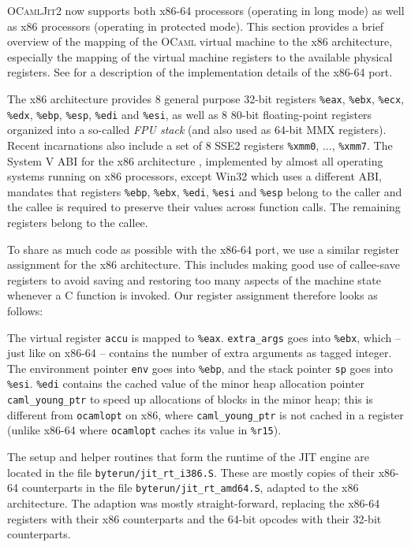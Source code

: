 \documentclass[12pt,a4paper,final]{article}
\begin{document}
\textsc{OCamlJit2} now supports both x86-64 processors (operating in long mode)
as well as x86 processors (operating in protected mode). This section provides a brief
overview of the mapping of the \textsc{OCaml} virtual machine to the x86
architecture, especially the mapping of the virtual machine registers to the available
physical registers. See \cite{Meurer10:OCamlJit2.0} for a description of the implementation
details of the x86-64 port.

The x86 architecture \cite{Intel10Vol1} provides $8$ general purpose 32-bit registers
\texttt{\%eax}, \texttt{\%ebx}, \texttt{\%ecx}, \texttt{\%edx}, \texttt{\%ebp}, \texttt{\%esp},
\texttt{\%edi} and \texttt{\%esi}, as well as $8$ 80-bit floating-point registers organized
into a so-called \emph{FPU stack} (and also used as 64-bit MMX registers). Recent incarnations also
include a set of $8$ SSE2 registers \texttt{\%xmm0}, $\ldots$, \texttt{\%xmm7}.
The System V ABI for the x86 architecture \cite{SCO97Abi386}, implemented by almost all
operating systems running on x86 processors, except Win32 which uses a different ABI,
mandates that registers \texttt{\%ebp}, \texttt{\%ebx}, \texttt{\%edi}, \texttt{\%esi}
and \texttt{\%esp} belong to the caller and the callee is required to preserve their
values across function calls. The remaining registers belong to the callee.

To share as much code as possible with the x86-64 port, we use a similar register assignment
for the x86 architecture. This includes making good use of callee-save registers to avoid
saving and restoring too many aspects of the machine state whenever a C function is
invoked. Our register assignment therefore looks as follows:

The virtual register \texttt{accu} is mapped to \texttt{\%eax}.
\texttt{extra\_args} goes into \texttt{\%ebx}, which -- just like on x86-64 -- contains
the number of extra arguments as tagged integer.
The environment pointer \texttt{env} goes into \texttt{\%ebp}, and
the stack pointer \texttt{sp} goes into \texttt{\%esi}.
\texttt{\%edi} contains the cached value of the minor heap allocation pointer
\texttt{caml\_young\_ptr} to speed up allocations of blocks in the minor heap; this
is different from \texttt{ocamlopt} on x86, where \texttt{caml\_young\_ptr} is not
cached in a register (unlike x86-64 where \texttt{ocamlopt} caches its value in \texttt{\%r15}).

The setup and helper routines that form the runtime of the JIT engine are located in the
file \texttt{byterun/jit\_rt\_i386.S}. These are mostly copies of their x86-64 counterparts
in the file \texttt{byterun/jit\_rt\_amd64.S}, adapted to the x86 architecture. The
adaption was mostly straight-forward, replacing the x86-64 registers with their x86
counterparts and the 64-bit opcodes with their 32-bit counterparts.
\end{document}
